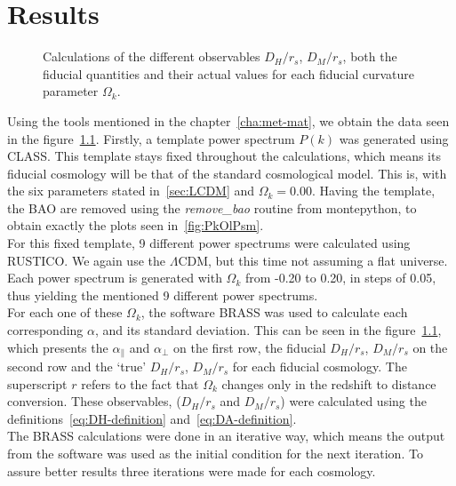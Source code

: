 \chapter{Results}
\label{cha:results}


\begin{figure}[b]
	\centering
%
\resizebox{0.99\textwidth}{!}{}
	\caption{Calculations of the different observables $D_H /r_s$, $D_M /r_s$, both the fiducial quantities and their actual values for each fiducial curvature parameter $\Omega_k$.}
	\label{fig:DA_DH}
\end{figure}

Using the tools mentioned in the chapter~\ref{cha:met-mat}, we obtain the data seen in the figure~\ref{fig:DA_DH}. Firstly, a template power spectrum $P(k)$ was generated using CLASS. This template stays fixed throughout the calculations, which means its fiducial cosmology will be that of the standard cosmological model. This is, with the six parameters stated in~\ref{sec:LCDM} and $\Omega_k=0.00$. Having the template, the BAO are removed using the \textit{remove\_bao} routine from montepython, to obtain exactly the plots seen in~\ref{fig:PkOlPsm}. \\

For this fixed template, 9 different power spectrums were calculated using RUSTICO\@. We again use the $\Lambda$CDM, but this time not assuming a flat universe. Each power spectrum is generated with $\Omega_k$ from -0.20 to 0.20, in steps of 0.05, thus yielding the mentioned 9 different power spectrums. \\

For each one of these $\Omega_k$, the software BRASS was used to calculate each corresponding $\alpha$, and its standard deviation. This can be seen in the figure~\ref{fig:DA_DH}, which presents the $\alpha_\parallel$ and $\alpha_\perp$ on the first row, the fiducial $D_H / r_s$, $D_M/r_s $ on the second row and the `true' $D_H / r_s$, $D_M /r_s$ for each fiducial cosmology. The superscript ${r}$ refers to the fact that $\Omega_k$ changes only in the redshift to distance conversion. 
These observables, ($D_H /r_s$ and $D_M /r_s $) were calculated using the definitions~\eqref{eq:DH-definition} and~\eqref{eq:DA-definition}. \\

The BRASS calculations were done in an iterative way, which means the output from the software was used as the initial condition for the next iteration. To assure better results three iterations were made for each cosmology.  \\

